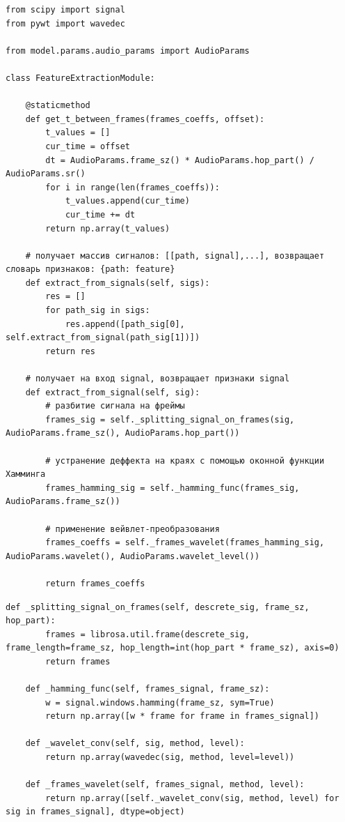 \documentclass[utf8x, 14pt, oneside, a4paper]{article}
\begin{document}
		\newpage
		\begin{lstlisting}[caption=FeatureExtractionModule]
from scipy import signal
from pywt import wavedec

from model.params.audio_params import AudioParams

class FeatureExtractionModule:
	
	@staticmethod
	def get_t_between_frames(frames_coeffs, offset):
		t_values = []
		cur_time = offset
		dt = AudioParams.frame_sz() * AudioParams.hop_part() / AudioParams.sr()
		for i in range(len(frames_coeffs)):
			t_values.append(cur_time)
			cur_time += dt
		return np.array(t_values)
	
	# получает массив сигналов: [[path, signal],...], возвращает словарь признаков: {path: feature}
	def extract_from_signals(self, sigs):
		res = []
		for path_sig in sigs:
			res.append([path_sig[0], self.extract_from_signal(path_sig[1])])
		return res
	
	# получает на вход signal, возвращает признаки signal
	def extract_from_signal(self, sig):
		# разбитие сигнала на фреймы
		frames_sig = self._splitting_signal_on_frames(sig, AudioParams.frame_sz(), AudioParams.hop_part())
		
		# устранение деффекта на краях с помощью оконной функции Хамминга
		frames_hamming_sig = self._hamming_func(frames_sig, AudioParams.frame_sz())
		
		# применение вейвлет-преобразования
		frames_coeffs = self._frames_wavelet(frames_hamming_sig, AudioParams.wavelet(), AudioParams.wavelet_level())
		
		return frames_coeffs
	\end{lstlisting}
	\newpage
	\begin{lstlisting}[caption=FeatureExtractionModule Продолжение]
	def _splitting_signal_on_frames(self, descrete_sig, frame_sz, hop_part):
		frames = librosa.util.frame(descrete_sig, frame_length=frame_sz, hop_length=int(hop_part * frame_sz), axis=0)
		return frames
	
	def _hamming_func(self, frames_signal, frame_sz):
		w = signal.windows.hamming(frame_sz, sym=True)
		return np.array([w * frame for frame in frames_signal])
	
	def _wavelet_conv(self, sig, method, level):
		return np.array(wavedec(sig, method, level=level))
	
	def _frames_wavelet(self, frames_signal, method, level):
		return np.array([self._wavelet_conv(sig, method, level) for sig in frames_signal], dtype=object)

		\end{lstlisting}
\end{document}
